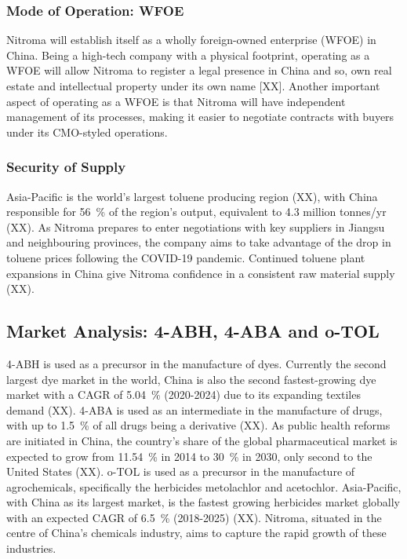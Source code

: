 \subsubsection{Mode of Operation: WFOE}
Nitroma will establish itself as a wholly foreign-owned enterprise (WFOE) in China. Being a high-tech company with a physical footprint, operating as a WFOE will allow Nitroma to register a legal presence in China and so, own real estate and intellectual property under its own name [XX]. Another important aspect of operating as a WFOE is that Nitroma will have independent management of its processes, making it easier to negotiate contracts with buyers under its CMO-styled operations.


\subsubsection{Security of Supply}
Asia-Pacific is the world's largest toluene producing region (XX), with China responsible for \SI{56}{\percent} of the region’s output, equivalent to 4.3 million tonnes/yr (XX). As Nitroma prepares to enter negotiations with key suppliers in Jiangsu and neighbouring provinces, the company aims to take advantage of the drop in toluene prices following the COVID-19 pandemic. Continued toluene plant expansions in China give Nitroma confidence in a consistent raw material supply (XX).

\subsection{Market Analysis: 4-ABH, 4-ABA and o-TOL}
4-ABH is used as a precursor in the manufacture of dyes. Currently the second largest dye market in the world, China is also the second fastest-growing dye market with a CAGR of \SI{5.04}{\percent} (2020-2024) due to its expanding textiles demand (XX). 4-ABA is used as an intermediate in the manufacture of drugs, with up to \SI{1.5}{\percent} of all drugs being a derivative (XX). As public health reforms are initiated in China, the country’s share of the global pharmaceutical market is expected to grow from \SI{11.54}{\percent} in 2014 to \SI{30}{\percent} in 2030, only second to the United States (XX). o-TOL is used as a precursor in the manufacture of agrochemicals, specifically the herbicides metolachlor and acetochlor. Asia-Pacific, with China as its largest market, is the fastest growing herbicides market globally with an expected CAGR of \SI{6.5}{\percent} (2018-2025) (XX). Nitroma, situated in the centre of China’s chemicals industry, aims to capture the rapid growth of these industries.  

